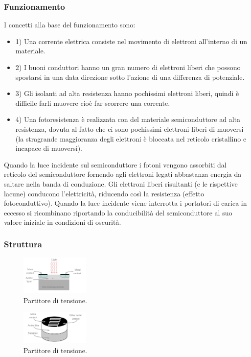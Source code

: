 \documentclass[12pt,oneside,a4paper]{article}
\begin{document}
\subsubsection{Funzionamento}
I concetti alla base del funzionamento sono:
\begin{itemize}
    \item 1) Una corrente elettrica consiste nel movimento di elettroni all'interno di un materiale.
    \item 2) I buoni conduttori hanno un gran numero di elettroni liberi che possono spostarsi in una data direzione sotto l'azione di una differenza di potenziale.
    \item 3) Gli isolanti ad alta resistenza hanno pochissimi elettroni liberi, quindi è difficile farli muovere cioè far scorrere una corrente.
    \item 4) Una fotoresistenza è realizzata con del materiale semiconduttore ad alta resistenza, dovuta al fatto che ci sono pochissimi elettroni liberi di muoversi (la stragrande maggioranza degli elettroni è bloccata nel reticolo cristallino e incapace di muoversi).
\end{itemize}

Quando la luce incidente sul semiconduttore i fotoni vengono assorbiti dal reticolo del semiconduttore fornendo agli elettroni legati abbastanza energia da saltare nella banda di conduzione. Gli elettroni liberi risultanti (e le rispettive lacune) conducono l'elettricità, riducendo così la resistenza (effetto fotoconduttivo). Quando la luce incidente viene interrotta i portatori di carica in eccesso si ricombinano riportando la conducibilità del semiconduttore al suo valore iniziale in condizioni di oscurità. 


\subsubsection{Struttura}
\begin{figure}[ht!]
    \centering
    \includegraphics[width=0.3\textwidth]{figures/fotoresistenza-struttura1.png}
    \caption{Partitore di tensione.}
\end{figure}

\begin{figure}[ht!]
    \centering
    \includegraphics[width=0.3\textwidth]{figures/fotoresistenza-struttura2.png}
    \caption{Partitore di tensione.}
\end{figure}
\end{document}
